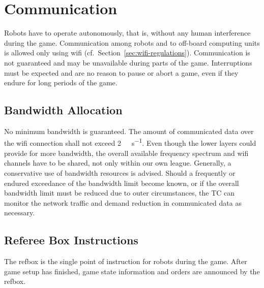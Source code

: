 \documentclass[12pt,twoside]{article}
\newcommand{\refsec}[1]{Section~\ref{#1}}
\begin{document}

\section{Communication}
\label{sec:communication}

Robots have to operate autonomously, that is, without any human
interference during the game. Communication among robots and to
off-board computing units is allowed only using wifi
(cf.~\refsec{sec:wifi-regulations}). Communication is not guaranteed
and may be unavailable during parts of the game. Interruptions must be
expected and are no reason to pause or abort a game, even if they
endure for long periods of the game.

\subsection{Bandwidth Allocation}
\label{sec:bandwidth}
No minimum bandwidth is guaranteed. The amount of communicated data
over the wifi connection shall not exceed
\SI[per-mode=symbol]{2}{\mega\bit\per\second}. Even though the lower
layers could provide for more bandwidth, the overall available
frequency spectrum and wifi channels have to be shared, not only
within our own league. Generally, a conservative use of bandwidth
resources is advised. Should a frequently or endured exceedance of the
bandwidth limit become known, or if the overall bandwidth limit must
be reduced due to outer circumstances, the \ac{TC} can monitor the network
traffic and demand reduction in communicated data as necessary.

\subsection{Referee Box Instructions}
\label{sec:referee-box}
The \ac{refbox} is the single point of instruction for robots during the
game. After game setup has finished, game state information and orders
are announced by the \ac{refbox}.
\end{document}
